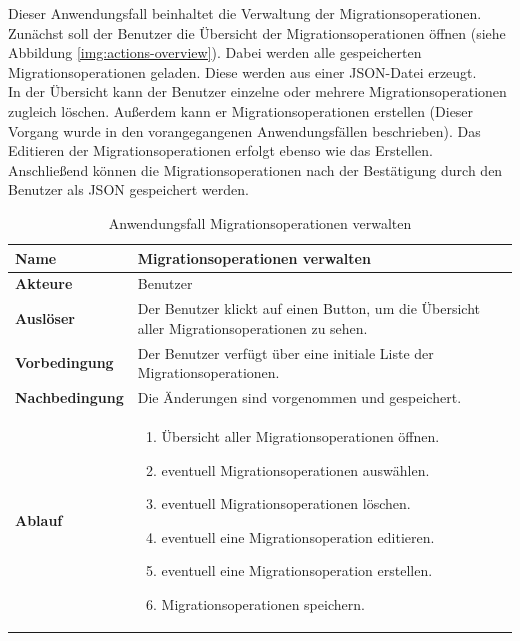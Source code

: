 Dieser Anwendungsfall beinhaltet die Verwaltung der Migrationsoperationen. Zunächst soll der Benutzer die Übersicht der Migrationsoperationen öffnen (siehe Abbildung \ref{img:actions-overview}). Dabei werden alle gespeicherten Migrationsoperationen geladen. Diese werden aus einer JSON-Datei erzeugt.\\ In der Übersicht kann der Benutzer einzelne oder mehrere Migrationsoperationen zugleich löschen. Außerdem kann er Migrationsoperationen erstellen (Dieser Vorgang wurde in den vorangegangenen Anwendungsfällen beschrieben). Das Editieren der Migrationsoperationen erfolgt ebenso wie das Erstellen.\\
Anschließend können die Migrationsoperationen nach der Bestätigung durch den Benutzer als JSON gespeichert werden.
\begin{table}[H]
	\centering
	\caption{Anwendungsfall Migrationsoperationen verwalten}
	\begin{tabular}{ |p{4cm}|p{8cm}| }
		\hline
		\textbf{Name} & Migrationsoperationen verwalten  \\
		\hline
		\textbf{Akteure} &  Benutzer \\
		\hline
		\textbf{Auslöser} &  Der Benutzer klickt auf einen Button, um die Übersicht aller Migrationsoperationen zu sehen. \\
		\hline
		\textbf{Vorbedingung} & Der Benutzer verfügt über eine initiale Liste der Migrationsoperationen.  \\
		\hline
		\textbf{Nachbedingung} & Die Änderungen sind vorgenommen und gespeichert.  \\
		\hline
		\textbf{Ablauf} & 
		\begin{enumerate}
			\item Übersicht aller Migrationsoperationen öffnen.
			\item eventuell Migrationsoperationen auswählen.
			\item eventuell Migrationsoperationen löschen.
			\item eventuell eine Migrationsoperation editieren.
			\item eventuell eine Migrationsoperation erstellen.
			\item Migrationsoperationen speichern.
		\end{enumerate}   \\
		\hline
		
	\end{tabular}
	\label{table:ks-speichern}
\end{table}



